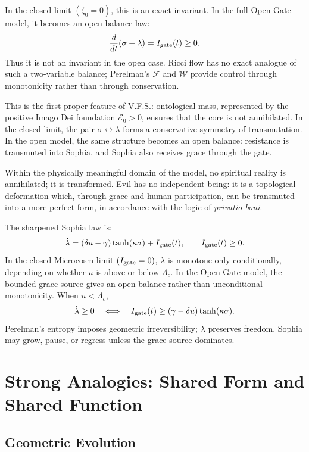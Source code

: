 \documentclass[11pt]{article}
\newcommand{\VFS}{V.F.S.}
\newcommand{\Gate}{I_{\rm gate}}
\newcommand{\Ezero}{\mathcal{E}_0}
\newcommand{\Lc}{\Lambda_c}
\begin{document}
In the closed limit $(\zeta_0=0)$, this is an exact invariant. In the full Open-Gate model, it becomes an open balance law:
\begin{equation}
\frac{d}{dt}(\sigma+\lambda)=\Gate(t)\ge 0.
\end{equation}
Thus it is not an invariant in the open case. Ricci flow has no exact analogue of such a two-variable balance; Perelman's $\mathcal F$ and $\mathcal W$ provide control through monotonicity rather than through conservation.

This is the first proper feature of \VFS{}: ontological mass, represented by the positive Imago Dei foundation $\Ezero>0$, ensures that the core is not annihilated. In the closed limit, the pair $\sigma\leftrightarrow\lambda$ forms a conservative symmetry of transmutation. In the open model, the same structure becomes an open balance: resistance is transmuted into Sophia, and Sophia also receives grace through the gate.

Within the physically meaningful domain of the model, no spiritual reality is annihilated; it is transformed. Evil has no independent being: it is a topological deformation which, through grace and human participation, can be transmuted into a more perfect form, in accordance with the logic of \emph{privatio boni}.

The sharpened Sophia law is:
\begin{equation}
\dot\lambda=(\delta u-\gamma)\tanh(\kappa\sigma)+\Gate(t),
\qquad
\Gate(t)\ge0.
\end{equation}
In the closed Microcosm limit $(\Gate=0)$, $\lambda$ is monotone only conditionally, depending on whether $u$ is above or below $\Lc$. In the Open-Gate model, the bounded grace-source gives an open balance rather than unconditional monotonicity. When $u<\Lc$,
\begin{equation}
\dot\lambda\ge0
\quad\Longleftrightarrow\quad
\Gate(t)\ge(\gamma-\delta u)\tanh(\kappa\sigma).
\end{equation}
Perelman's entropy imposes geometric irreversibility; $\lambda$ preserves freedom. Sophia may grow, pause, or regress unless the grace-source dominates.

\section{Strong Analogies: Shared Form and Shared Function}

\subsection{Geometric Evolution}
\end{document}
